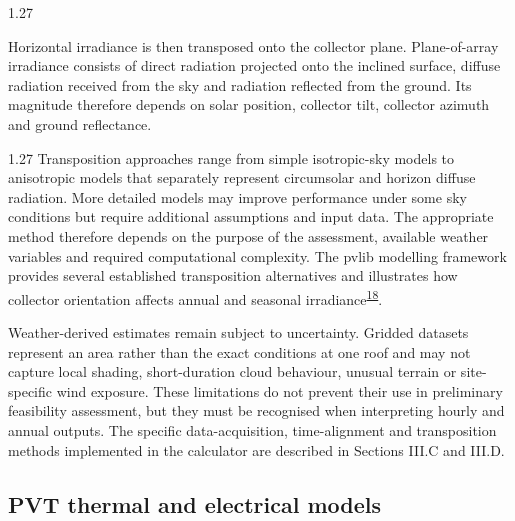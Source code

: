 \documentclass[12pt,letterpaper]{article}
\newcommand{\done}{\ \textcolor{green!45!black}{$\checkmark$}} %
\DeclareRobustCommand{\citenum}[1]{\hyperlink{ref:#1}{#1}} %
\begin{document}
\begin{spacing}{1.27}
\vspace{0.15in}

Horizontal irradiance is then transposed onto the collector plane. Plane-of-array irradiance consists of direct radiation projected onto the inclined surface, diffuse radiation received from the sky and radiation reflected from the ground. Its magnitude therefore depends on solar position, collector tilt, collector azimuth and ground reflectance.\par
\end{spacing}

\begin{spacing}{1.27}
Transposition approaches range from simple isotropic-sky models to anisotropic models that separately represent circumsolar and horizon diffuse radiation. More detailed models may improve performance under some sky conditions but require additional assumptions and input data. The appropriate method therefore depends on the purpose of the assessment, available weather variables and required computational complexity. The pvlib modelling framework provides several established transposition alternatives and illustrates how collector orientation affects annual and seasonal irradiance\textsuperscript{\citenum{18}}.\par

\vspace{0.15in}

Weather-derived estimates remain subject to uncertainty. Gridded datasets represent an area rather than the exact conditions at one roof and may not capture local shading, short-duration cloud behaviour, unusual terrain or site-specific wind exposure. These limitations do not prevent their use in preliminary feasibility assessment, but they must be recognised when interpreting hourly and annual outputs. The specific data-acquisition, time-alignment and transposition methods implemented in the calculator are described in Sections III.C and III.D.\par
\end{spacing}

\subsection[PVT thermal and electrical models\done]{PVT thermal and electrical models}\label{sec11}
\end{document}
